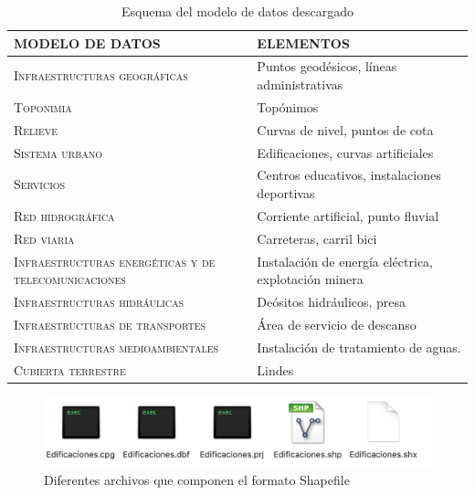 \begin{enumerate}
	\begin{table}[H]
		\caption{Esquema del modelo de datos descargado}
		\label{elementos-mapas}
		\centering
		\begin{tabular}{|m{6.2cm}|m{5.4cm}|}
			\hline
			\rowcolor[HTML]{EFEFEF} 
			\textbf{MODELO DE DATOS} & \textbf{ELEMENTOS} \\ \hline
			\textsc{Infraestructuras geográficas}&   Puntos geodésicos, líneas administrativas            \\ \hline
			\textsc{Toponimia}&              Topónimos      \\ \hline
			\textsc{Relieve}&         Curvas de nivel, puntos de cota           \\ \hline
			\textsc{Sistema urbano}&       Edificaciones, curvas artificiales             \\ \hline
			\textsc{Servicios}&       Centros educativos, instalaciones deportivas             \\ \hline
			\textsc{Red hidrográfica}&       Corriente artificial, punto fluvial  \\ \hline
			\textsc{Red viaria}&      Carreteras, carril bici              \\ \hline
			\textsc{Infraestructuras energéticas y de telecomunicaciones}&     Instalación de energía eléctrica, explotación minera               \\ \hline
			\textsc{Infraestructuras hidráulicas}&     Deósitos hidráulicos, presa               \\ \hline
			\textsc{Infraestructuras de transportes} &         Área de servicio de descanso       \\ \hline
			\textsc{Infraestructuras medioambientales} &     Instalación de tratamiento de aguas.               \\ \hline
			\textsc{Cubierta terrestre}&           Lindes        \\ \hline
		\end{tabular}
	\end{table}
	
	\begin{figure}[H]
		\centering
		\includegraphics[width=1\linewidth]{imagenes/capitulo2/shapefile}
		\caption{Diferentes archivos que componen el formato Shapefile }
		\label{fig:shapefile}
	\end{figure}
	

\end{enumerate}
